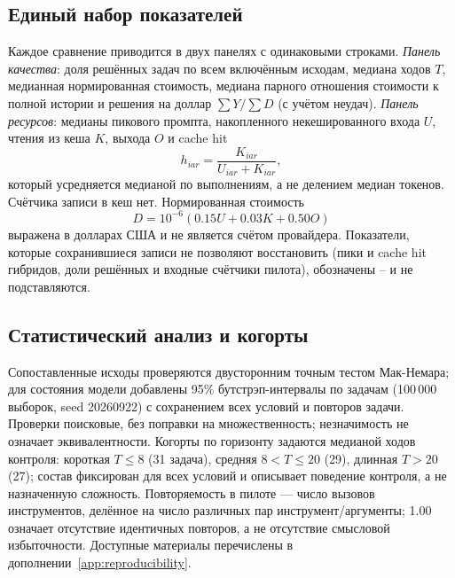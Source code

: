 \subsection{Единый набор показателей}
Каждое сравнение приводится в двух панелях с одинаковыми строками.
\emph{Панель качества}: доля решённых задач по всем включённым исходам,
медиана ходов $T$, медианная нормированная стоимость, медиана парного
отношения стоимости к полной истории и решения на доллар $\sum Y/\sum D$
(с учётом неудач). \emph{Панель ресурсов}: медианы пикового промпта,
накопленного некешированного входа $U$, чтения из кеша $K$, выхода $O$
и cache hit
\begin{equation}
 h_{iar}=\frac{K_{iar}}{U_{iar}+K_{iar}},
 \label{eq:cache-hit}
\end{equation}
который усредняется медианой по выполнениям, а не делением медиан
токенов. Счётчика записи в кеш нет. Нормированная стоимость
\begin{equation}
 D=10^{-6}(0.15U+0.03K+0.50O)
 \label{eq:referencecost}
\end{equation}
выражена в долларах США и не является счётом провайдера. Показатели,
которые сохранившиеся записи не позволяют восстановить (пики и cache hit
гибридов, доли решённых и входные счётчики пилота), обозначены --
и не подставляются.

\subsection{Статистический анализ и когорты}
Сопоставленные исходы проверяются двусторонним точным тестом Мак-Немара;
для состояния модели добавлены 95\% бутстрэп-интервалы по задачам
(100\,000 выборок, seed 20260922) с сохранением всех условий и повторов
задачи. Проверки поисковые, без поправки на множественность; незначимость
не означает эквивалентности. Когорты по горизонту задаются медианой ходов
контроля: короткая $T\leq8$ (31 задача), средняя $8<T\leq20$ (29),
длинная $T>20$ (27); состав фиксирован для всех условий и описывает
поведение контроля, а не назначенную сложность. Повторяемость в пилоте ---
число вызовов инструментов, делённое на число различных пар
инструмент/аргументы; 1.00 означает отсутствие идентичных повторов,
а не отсутствие смысловой избыточности. Доступные материалы перечислены
в дополнении~\ref{app:reproducibility}.

